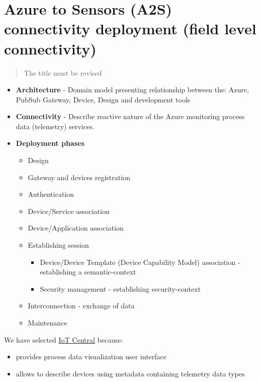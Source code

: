 \documentclass[
]{article}
\providecommand{\tightlist}{%
  \setlength{\itemsep}{0pt}\setlength{\parskip}{0pt}}
\begin{document}
\hypertarget{azure-to-sensors-a2s-connectivity-deployment-field-level-connectivity}{%
\section{Azure to Sensors (A2S) connectivity deployment (field level
connectivity)}\label{azure-to-sensors-a2s-connectivity-deployment-field-level-connectivity}}

\begin{quote}
The title must be revised
\end{quote}

\begin{itemize}
\tightlist
\item
  \textbf{Architecture} - Domain model presenting relationship between
  the: Azure, PubSub Gateway, Device, Design and development tools
\item
  \textbf{Connectivity} - Describe reactive nature of the Azure
  monitoring process data (telemetry) services.
\item
  \textbf{Deployment phases}

  \begin{itemize}
  \tightlist
  \item
    Design
  \item
    Gateway and devices registration
  \item
    Authentication
  \item
    Device/Service association
  \item
    Device/Application association
  \item
    Establishing session

    \begin{itemize}
    \tightlist
    \item
      Device/Device Template (Device Capability Model) association -
      establishing a semantic-context
    \item
      Security management - establishing security-context
    \end{itemize}
  \item
    Interconnection - exchange of data
  \item
    Maintenance
  \end{itemize}
\end{itemize}

We have selected
\href{https://docs.microsoft.com/azure/iot-central/core/}{IoT Central}
because:

\begin{itemize}
\tightlist
\item
  provides process data visualization user interface
\item
  allows to describe devices using metadata containing telemetry data
  types
\end{itemize}
\end{document}
